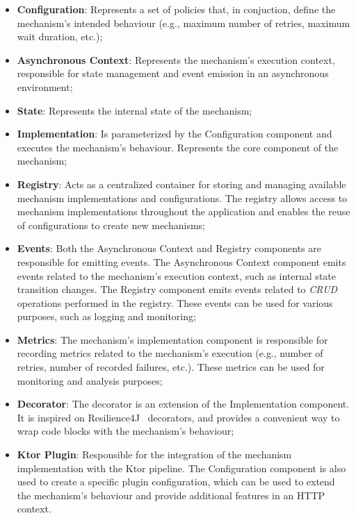 \begin{itemize}
    \item \textbf{Configuration}: Represents a set of policies that, in conjuction, define the mechanism's intended behaviour (e.g., maximum number of retries, maximum wait duration, etc.);
    \item \textbf{Asynchronous Context}: Represents the mechanism's execution context, responsible for state management and event emission in an asynchronous environment;
    \item \textbf{State}: Represents the internal state of the mechanism;
    \item \textbf{Implementation}: Is parameterized by the Configuration component and executes the mechanism's behaviour.
    Represents the core component of the mechanism;
    \item \textbf{Registry}: Acts as a centralized container for storing and managing available mechanism implementations and configurations.
    The registry allows access to mechanism implementations throughout the application and enables the reuse of configurations to create new mechanisms;
    \item \textbf{Events}: Both the Asynchronous Context and Registry components are responsible for emitting events.
    The Asynchronous Context component emits events related to the mechanism's execution context, such as internal state transition changes.
    The Registry component emits events related to \textit{CRUD} operations performed in the registry.
    These events can be used for various purposes, such as logging and monitoring;
    \item \textbf{Metrics}: The mechanism's implementation component is responsible for recording metrics related to the mechanism's execution (e.g., number of retries, number of recorded failures, etc.).
    These metrics can be used for monitoring and analysis purposes;
    \item \textbf{Decorator}: The decorator is an extension of the Implementation component.
    It is inspired on Resilience4J~\cite{resilience4j} decorators, and provides a convenient way to wrap code blocks with the mechanism's behaviour;
    \item \textbf{Ktor Plugin}: Responsible for the integration of the mechanism implementation with the Ktor pipeline.
    The Configuration component is also used to create a specific plugin configuration,
    which can be used to extend the mechanism's behaviour and provide additional features in an HTTP context.
\end{itemize}


